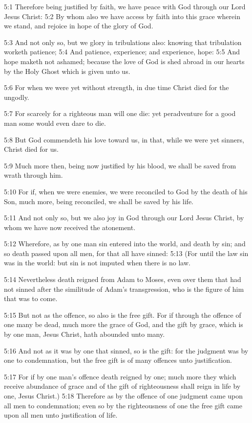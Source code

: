 5:1 Therefore being justified by faith, we have peace with God through our Lord Jesus Christ: 5:2 By whom also we have access by faith into this grace wherein we stand, and rejoice in hope of the glory of God.

5:3 And not only so, but we glory in tribulations also: knowing that tribulation worketh patience; 5:4 And patience, experience; and experience, hope: 5:5 And hope maketh not ashamed; because the love of God is shed abroad in our hearts by the Holy Ghost which is given unto us.

5:6 For when we were yet without strength, in due time Christ died for the ungodly.

5:7 For scarcely for a righteous man will one die: yet peradventure for a good man some would even dare to die.

5:8 But God commendeth his love toward us, in that, while we were yet sinners, Christ died for us.

5:9 Much more then, being now justified by his blood, we shall be saved from wrath through him.

5:10 For if, when we were enemies, we were reconciled to God by the death of his Son, much more, being reconciled, we shall be saved by his life.

5:11 And not only so, but we also joy in God through our Lord Jesus Christ, by whom we have now received the atonement.

5:12 Wherefore, as by one man sin entered into the world, and death by sin; and so death passed upon all men, for that all have sinned: 5:13 (For until the law sin was in the world: but sin is not imputed when there is no law.

5:14 Nevertheless death reigned from Adam to Moses, even over them that had not sinned after the similitude of Adam's transgression, who is the figure of him that was to come.

5:15 But not as the offence, so also is the free gift. For if through the offence of one many be dead, much more the grace of God, and the gift by grace, which is by one man, Jesus Christ, hath abounded unto many.

5:16 And not as it was by one that sinned, so is the gift: for the judgment was by one to condemnation, but the free gift is of many offences unto justification.

5:17 For if by one man's offence death reigned by one; much more they which receive abundance of grace and of the gift of righteousness shall reign in life by one, Jesus Christ.)  5:18 Therefore as by the offence of one judgment came upon all men to condemnation; even so by the righteousness of one the free gift came upon all men unto justification of life.

